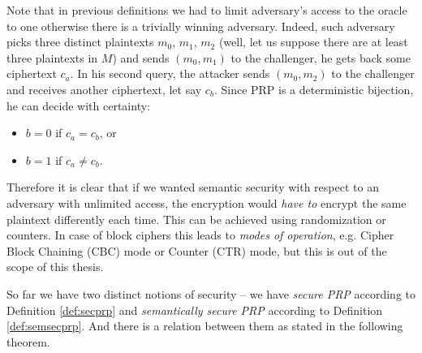 \begin{note}
	Note that in previous definitions we had to limit adversary's access to the oracle to one otherwise there is a trivially winning adversary. Indeed, such adversary picks three distinct plaintexts $m_0$, $m_1$, $m_2$ (well, let us suppose there are at least three plaintexts in $M$) and sends $(m_0,m_1)$ to the challenger, he gets back some ciphertext $c_a$. In his second query, the attacker sends $(m_0,m_2)$ to the challenger and receives another ciphertext, let say $c_b$. Since PRP is a deterministic bijection, he can decide with certainty:
	\begin{itemize}
		\item $b=0$ if $c_a = c_b$, or
		\item $b=1$ if $c_a \neq c_b$.
	\end{itemize}
	
	Therefore it is clear that if we wanted semantic security with respect to an adversary with unlimited access, the encryption would {\em have to} encrypt the same plaintext differently each time. This can be achieved using randomization or counters. In case of block ciphers this leads to {\em modes of operation}, e.g. Cipher Block Chaining (CBC) mode or Counter (CTR) mode, but this is out of the scope of this thesis.
\end{note}

So far we have two distinct notions of security -- we have {\em secure PRP} according to Definition \ref{def:secprp} and {\em semantically secure PRP} according to Definition \ref{def:semsecprp}. And there is a relation between them as stated in the following theorem.

